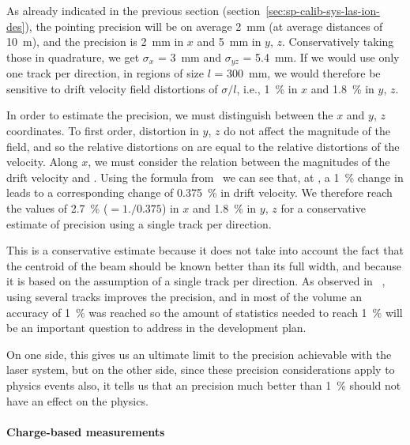 As already indicated in the previous section (section~\ref{sec:sp-calib-sys-las-ion-des}), the pointing precision will be on average \SI{2}{\milli\m} (at average distances of \SI{10}{\m}), and the  precision is \SI{2}{\milli\m} in $x$ and \SI{5}{\milli\m} in $y$, $z$. Conservatively taking those in quadrature, we get $\sigma_x$ =  \SI{3}{\milli\m} and $\sigma_{yz}$ = \SI{5.4}{\milli\m}.
If we would use only one track per direction, in regions of size $l$ = \SI{300}{\milli\m}, we would therefore be sensitive to drift velocity field distortions of $\sigma /l$, i.e., \SI{1}{\%} in $x$ and \SI{1.8}{\%} in $y$, $z$. 

In order to estimate the \efield precision, we must distinguish between the $x$ and $y$, $z$ coordinates. To first order, distortion in $y$, $z$ do not affect the magnitude of the field, and so the relative distortions on \efield are equal to the relative distortions of the velocity. Along $x$, we must consider the relation between the magnitudes of the drift velocity and \efield. Using the formula from~\cite{Li:2015rqa,Walkowiak:2000wf} we can see that, at \spmaxfield, a \SI{1}{\%} change in \efield leads to a corresponding change of \SI{0.375}{\%} in drift velocity. We therefore reach the values of \SI{2.7}{\%} ($=1./0.375$) in $x$ and \SI{1.8}{\%} in $y$, $z$ for a conservative estimate of \efield precision using a single track per direction. 

This is a conservative estimate because it does not take into account the fact that the centroid of the beam should be known better than its full width, and because it is based on the assumption of a single track per direction.  
As observed in ~\cite{bib:uBlaser2019}, using several tracks improves the precision, and in most of the volume an accuracy of \SI{1}{\%} was reached so the amount of statistics needed to reach \SI{1}{\%} will be an important question to address in the development plan. 



On one side, this gives us an ultimate limit to the \efield precision achievable with the laser system, but on the other side, since these  precision considerations apply to physics events also, it tells us that an \efield precision much better than \SI{1}{\%} should not have an effect on the physics.



\paragraph{Charge-based measurements}

